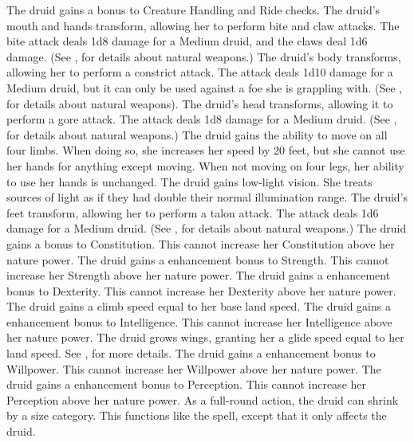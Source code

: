 The druid gains a  bonus to Creature Handling and Ride checks.
The druid's mouth and hands transform, allowing her to perform bite and claw attacks.
The bite attack deals 1d8 damage for a Medium druid, and the claws deal 1d6 damage.
(See , for details about natural weapons.)
The druid's body transforms, allowing her to perform a constrict attack.
The attack deals 1d10 damage for a Medium druid, but it can only be used against a foe she is grappling with.
(See , for details about natural weapons).
The druid's head transforms, allowing it to perform a gore attack.
The attack deals 1d8 damage for a Medium druid.
(See , for details about natural weapons.)
The druid gains the ability to move on all four limbs.
When doing so, she increases her speed by 20 feet, but she cannot use her hands for anything except moving.
When not moving on four legs, her ability to use her hands is unchanged.
The druid gains low-light vision.
She treats sources of light as if they had double their normal illumination range.
The druid's feet transform, allowing her to perform a talon attack.
The attack deals 1d6 damage for a Medium druid.
(See , for details about natural weapons.)
The druid gains a  bonus to Constitution.
This cannot increase her Constitution above her nature power.
The druid gains a  enhancement bonus to Strength.
This cannot increase her Strength above her nature power.
The druid gains a  enhancement bonus to Dexterity.
This cannot increase her Dexterity above her nature power.
The druid gains a climb speed equal to her base land speed.
The druid gains a  enhancement bonus to Intelligence.
This cannot increase her Intelligence above her nature power.
The druid grows wings, granting her a glide speed equal to her land speed.
See , for more details.
The druid gains a  enhancement bonus to Willpower.
This cannot increase her Willpower above her nature power.
The druid gains a  enhancement bonus to Perception.
This cannot increase her Perception above her nature power.
As a full-round action, the druid can shrink by a size category.
This functions like the  spell, except that it only affects the druid.
